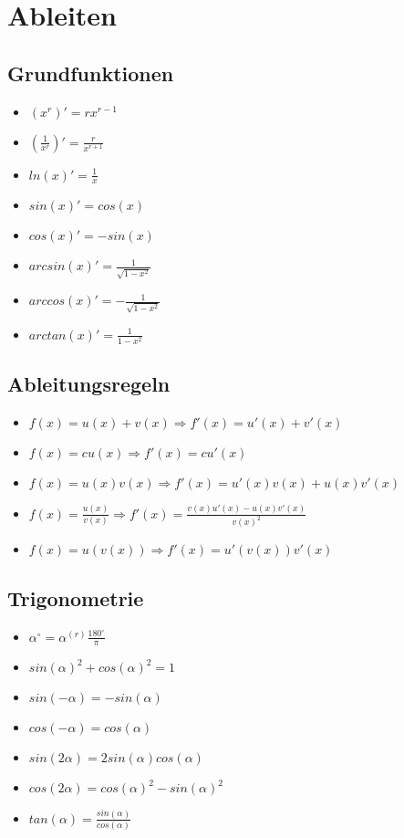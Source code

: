 \section{Ableiten}

\subsection{Grundfunktionen}
\begin{itemize}
	\item $(x^r)' = r x^{r-1}$
	\item $(\frac{1}{x^r})' = \frac{r}{x^{r+1}}$
	\item $ln(x)' = \frac{1}{x}$
	\item $sin(x)' = cos(x)$
	\item $cos(x)' = -sin(x)$
	\item $arcsin(x)' = \frac{1}{\sqrt{1-x^2}}$
	\item $arccos(x)' = - \frac{1}{\sqrt{1-x^2}}$
	\item $arctan(x)' = \frac{1}{1-x^2}$
\end{itemize}

\subsection{Ableitungsregeln}
\begin{itemize}
	\item $f(x) = u(x) + v(x) \Rightarrow f'(x) = u'(x) + v'(x)$
	\item $f(x) = c u(x) \Rightarrow f'(x) = c u'(x)$
	\item $f(x) = u(x) v(x) \Rightarrow f'(x) = u'(x) v(x) + u(x) v'(x)$
	\item $f(x) = \frac{u(x)}{v(x)} \Rightarrow f'(x) = \frac{v(x) u'(x) - u(x) v'(x)}{v(x)^2}$
	\item $f(x) = u(v(x)) \Rightarrow f'(x) = u'(v(x)) v'(x)$
\end{itemize}

\subsection{Trigonometrie}
\begin{itemize}
	\item $\alpha^\circ = \alpha^{(r)} \frac{180^\circ}{\pi}$
	\item $sin(\alpha)^2 + cos(\alpha)^2 = 1$
	\item $sin(-\alpha) = - sin(\alpha)$
	\item $cos(-\alpha) = cos(\alpha)$
	\item $sin(2\alpha) = 2 sin(\alpha) cos(\alpha)$
	\item $cos(2\alpha) = cos(\alpha)^2 - sin(\alpha)^2$
	\item $tan(\alpha) = \frac{sin(\alpha)}{cos(\alpha)}$
\end{itemize}
